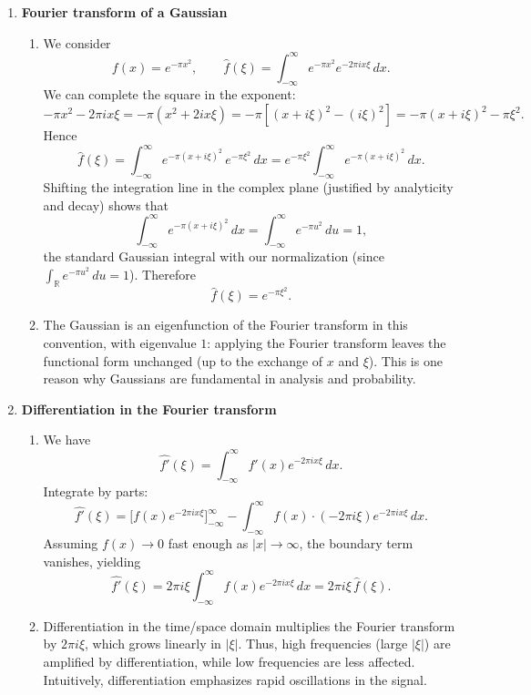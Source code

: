\documentclass[11pt]{article}
\begin{document}
\begin{enumerate}
\bigskip
\item \textbf{Fourier transform of a Gaussian}

\begin{enumerate}
\item We consider
\[
f(x)=e^{-\pi x^2},\qquad
\hat f(\xi)=\int_{-\infty}^{\infty} e^{-\pi x^2}e^{-2\pi i x\xi}\,dx.
\]
We can complete the square in the exponent:
\[
-\pi x^2 - 2\pi i x\xi = -\pi\left(x^2 + 2ix\xi\right)
= -\pi\left[(x+i\xi)^2 - (i\xi)^2\right]
= -\pi(x+i\xi)^2 - \pi\xi^2.
\]
Hence
\[
\hat f(\xi)=\int_{-\infty}^{\infty} 
e^{-\pi(x+i\xi)^2}\, e^{-\pi \xi^2}\,dx
= e^{-\pi\xi^2}\int_{-\infty}^{\infty}e^{-\pi(x+i\xi)^2}\,dx.
\]
Shifting the integration line in the complex plane (justified by analyticity and decay) shows that
\[
\int_{-\infty}^{\infty}e^{-\pi(x+i\xi)^2}\,dx
= \int_{-\infty}^{\infty}e^{-\pi u^2}\,du = 1,
\]
the standard Gaussian integral with our normalization (since
\(\int_{\mathbb{R}} e^{-\pi u^2}\,du=1\)).
Therefore
\[
\hat f(\xi) = e^{-\pi\xi^2}.
\]

\item The Gaussian is an eigenfunction of the Fourier transform in this convention, with eigenvalue $1$: applying the Fourier transform leaves the functional form unchanged (up to the exchange of $x$ and $\xi$). This is one reason why Gaussians are fundamental in analysis and probability.
\end{enumerate}

\bigskip
\item \textbf{Differentiation in the Fourier transform}

\begin{enumerate}
\item We have
\[
\widehat{f'}(\xi)
= \int_{-\infty}^{\infty} f'(x)e^{-2\pi i x\xi}\,dx.
\]
Integrate by parts:
\[
\widehat{f'}(\xi)
= \big[ f(x)e^{-2\pi i x\xi} \big]_{-\infty}^{\infty}
 - \int_{-\infty}^{\infty} f(x)\cdot(-2\pi i\xi)e^{-2\pi i x\xi}\,dx.
\]
Assuming $f(x)\to 0$ fast enough as $|x|\to\infty$, the boundary term vanishes, yielding
\[
\widehat{f'}(\xi)
= 2\pi i\xi\int_{-\infty}^{\infty} f(x)e^{-2\pi i x\xi}\,dx
= 2\pi i\xi\,\hat f(\xi).
\]

\item Differentiation in the time/space domain multiplies the Fourier transform by $2\pi i\xi$, which grows linearly in $|\xi|$. Thus, high frequencies (large $|\xi|$) are amplified by differentiation, while low frequencies are less affected. Intuitively, differentiation emphasizes rapid oscillations in the signal.
\end{enumerate}


\end{enumerate}
\end{document}
